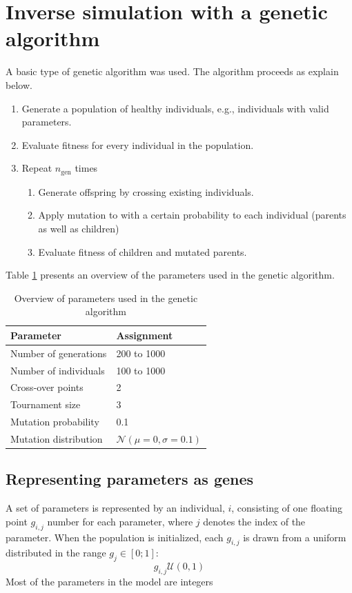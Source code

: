 \section{Inverse simulation with a genetic algorithm}\label{section:genetic_algorithm}
A basic type of genetic algorithm was used. The algorithm proceeds as explain below.
\begin{enumerate}
	\item Generate a population of healthy individuals, e.g., individuals with valid parameters.
	\item Evaluate fitness for every individual in the population.
	\item Repeat $n_\text{gen}$ times 
	\begin{enumerate}
		\item Generate offspring by crossing existing individuals.
		\item Apply mutation to with a certain probability to each individual (parents as well as children)
		\item Evaluate fitness of children and mutated parents.
	\end{enumerate}
\end{enumerate}
Table \ref{table:genetic_algorithm_parameters} presents an overview of the parameters used in the genetic algorithm. 

\begin{table}
	\centering
	\begin{tabular}{l|l}
		Parameter & Assignment\\\hline
		Number of generations & 200 to 1000\\
		Number of individuals & 100 to 1000\\
		Cross-over points & 2\\
		Tournament size & 3\\
		Mutation probability & 0.1\\
		Mutation distribution &  $\mathcal{N}(\mu = 0, \sigma = 0.1)$\\
	\end{tabular}
	\caption{Overview of parameters used in the genetic algorithm}
	\label{table:genetic_algorithm_parameters}
\end{table}

\subsection{Representing parameters as genes}
A set of parameters is represented by an individual, $i$, consisting of one floating point $g_{i,j}$ number for each parameter, where $j$ denotes the index of the parameter. When the population is initialized, each $g_{i,j}$ is drawn from a uniform distributed in the range $g_j \in [0;1]$:
\begin{equation}
g_{i,j} \mathcal{U}(0,1)
\end{equation}
Most of the parameters in the model are integers



